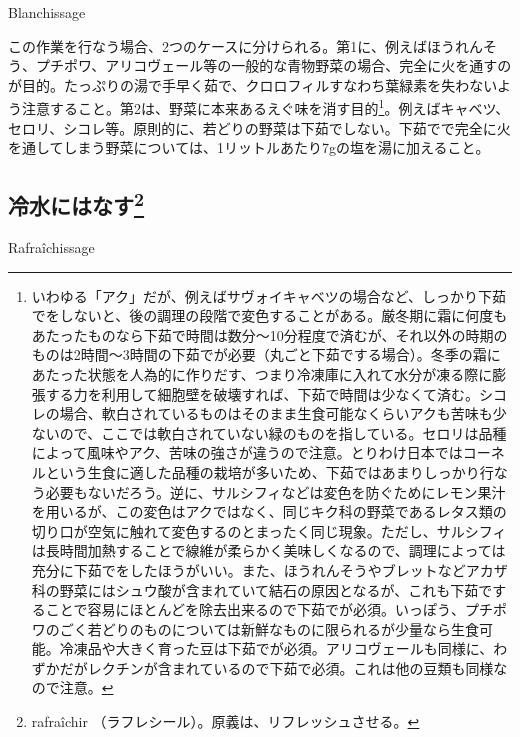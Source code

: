 \begin{main}
\begin{frsecbenv}

Blanchissage

\end{frsecbenv}

この作業を行なう場合、2つのケースに分けられる。第1に、例えばほうれんそう、プチポワ、アリコヴェール等の一般的な青物野菜の場合、完全に火を通すのが目的。たっぷりの湯で手早く茹で、クロロフィルすなわち葉緑素を失わないよう注意すること。第2は、野菜に本来あるえぐ味を消す目的\footnote{いわゆる「アク」だが、例えばサヴォイキャベツの場合など、しっかり下茹でをしないと、後の調理の段階で変色することがある。厳冬期に霜に何度もあたったものなら下茹で時間は数分〜10分程度で済むが、それ以外の時期のものは2時間〜3時間の下茹でが必要（丸ごと下茹でする場合）。冬季の霜にあたった状態を人為的に作りだす、つまり冷凍庫に入れて水分が凍る際に膨張する力を利用して細胞壁を破壊すれば、下茹で時間は少なくて済む。シコレの場合、軟白されているものはそのまま生食可能なくらいアクも苦味も少ないので、ここでは軟白されていない緑のものを指している。セロリは品種によって風味やアク、苦味の強さが違うので注意。とりわけ日本ではコーネルという生食に適した品種の栽培が多いため、下茹ではあまりしっかり行なう必要もないだろう。逆に、サルシフィなどは変色を防ぐためにレモン果汁を用いるが、この変色はアクではなく、同じキク科の野菜であるレタス類の切り口が空気に触れて変色するのとまったく同じ現象。ただし、サルシフィは長時間加熱することで線維が柔らかく美味しくなるので、調理によっては充分に下茹でをしたほうがいい。また、ほうれんそうやブレットなどアカザ科の野菜にはシュウ酸が含まれていて結石の原因となるが、これも下茹ですることで容易にほとんどを除去出来るので下茹でが必須。いっぽう、プチポワのごく若どりのものについては新鮮なものに限られるが少量なら生食可能。冷凍品や大きく育った豆は下茹でが必須。アリコヴェールも同様に、わずかだがレクチンが含まれているので下茹で必須。これは他の豆類も同様なので注意。}。例えばキャベツ、セロリ、シコレ等。原則的に、若どりの野菜は下茹でしない。下茹でで完全に火を通してしまう野菜については、1リットルあたり7gの塩を湯に加えること。

\hypertarget{rafraichissage}{%
\subsection[冷水にはなす]{\texorpdfstring{冷水にはなす\footnote{rafraîchir
  （ラフレシール）。原義は、リフレッシュさせる。}}{冷水にはなす}}\label{rafraichissage}}

\begin{frsecbenv}

Rafraîchissage


\end{frsecbenv}
\end{main}
